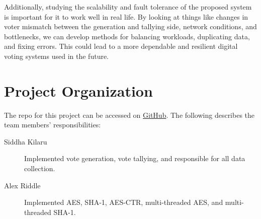 \documentclass[final,5p,times,twocolumn,authoryear, 10pt]{elsarticle}
\newcommand\repo[1]{https://github.com/siddha20/CSCI4320-Project/tree/master/#1}
\begin{document}
Additionally, studying the scalability and fault tolerance of the proposed
system is important for it to work well in real life. By looking at things like
changes in voter mismatch between the generation and tallying side, network
conditions, and bottlenecks, we can develop methods for balancing workloads,
duplicating data, and fixing errors. This could lead to a more dependable and
resilient digital voting systems used in the future.


\section{Project Organization}
\label{Project Organization}

The repo for this project can be accessed on \href{\repo}{GitHub}. The
following describes the team members' responsibilities:
\begin{description}
    \item[Siddha Kilaru] Implemented vote generation, vote tallying, and
    responsible for all data collection.
    \item[Alex Riddle] Implemented AES, SHA-1, AES-CTR, multi-threaded AES, and
                    multi-threaded SHA-1.
\end{description}
\end{document}
